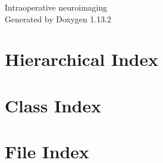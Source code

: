 \documentclass[twoside]{book}
\newcommand{\+}{\discretionary{\mbox{\scriptsize$\hookleftarrow$}}{}{}}
\newcommand{\clearemptydoublepage}{%
    \newpage{\pagestyle{empty}\cleardoublepage}%
  }
\begin{document}
  \raggedbottom
    \hypersetup{pageanchor=false,
                bookmarksnumbered=true,
                pdfencoding=unicode
               }
  \begin{titlepage}
  \vspace*{7cm}
  \begin{center}%
  {\Large Intraoperative neuroimaging}\\
  \vspace*{1cm}
  {\large Generated by Doxygen 1.13.2}\\
  \end{center}
  \end{titlepage}
  \clearemptydoublepage
  \tableofcontents
  \clearemptydoublepage
  \hypersetup{pageanchor=true}

\chapter{Hierarchical Index}

\chapter{Class Index}

\chapter{File Index}

\end{document}

